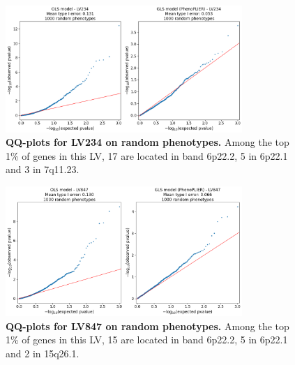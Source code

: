 \documentclass[
  a4paper,
]{article}
\newenvironment{fignos:tagged-figure}[1][]{
  \let\oldfigurename\figurename
  \renewcommand{\figurename}{Supplementary Figure}
}{
  \let\figurename\oldfigurename
}
\begin{document}
\begin{fignos:tagged-figure}[S2]

\begin{figure}
\hypertarget{fig:reg:nulls:qqplot:lv234}{%
\centering
\includegraphics[width=0.8\textwidth,height=\textheight]{images/gls/null_sims/models_lv234.png}
\caption{\textbf{QQ-plots for LV234 on random phenotypes.}
Among the top 1\% of genes in this LV, 17 are located in band 6p22.2, 5 in 6p22.1 and 3 in 7q11.23.}\label{fig:reg:nulls:qqplot:lv234}
}
\end{figure}

\end{fignos:tagged-figure}

\begin{fignos:tagged-figure}[S3]

\begin{figure}
\hypertarget{fig:reg:nulls:qqplot:lv847}{%
\centering
\includegraphics[width=0.8\textwidth,height=\textheight]{images/gls/null_sims/models_lv847.png}
\caption{\textbf{QQ-plots for LV847 on random phenotypes.}
Among the top 1\% of genes in this LV, 15 are located in band 6p22.2, 5 in 6p22.1 and 2 in 15q26.1.}\label{fig:reg:nulls:qqplot:lv847}
}
\end{figure}

\end{fignos:tagged-figure}
\end{document}
